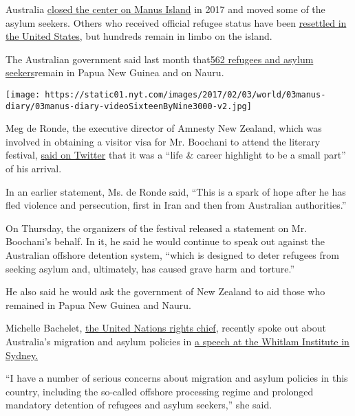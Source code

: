 Australia
\href{https://www.nytimes.com/2017/11/02/world/australia/manus-island-refugees.html?module=inline}{closed
the center on Manus Island} in 2017 and moved some of the asylum
seekers. Others who received official refugee status have been
\href{https://www.nytimes.com/2018/01/23/world/australia/manus-refugees-trump.html?module=inline}{resettled
in the United States}, but hundreds remain in limbo on the island.

The Australian government said last month
that\href{https://www.refugeecouncil.org.au/operation-sovereign-borders-offshore-detention-statistics/}{562
refugees and asylum seekers}remain in Papua New Guinea and on Nauru.

\texttt{[image: https://static01.nyt.com/images/2017/02/03/world/03manus-diary/03manus-diary-videoSixteenByNine3000-v2.jpg]}

Meg de Ronde, the executive director of Amnesty New Zealand, which was
involved in obtaining a visitor visa for Mr. Boochani to attend the
literary festival,
\href{https://twitter.com/MegdeRonde/status/1194932484758110208}{said on
Twitter} that it was a ``life \& career highlight to be a small part''
of his arrival.

In an earlier statement, Ms. de Ronde said, ``This is a spark of hope
after he has fled violence and persecution, first in Iran and then from
Australian authorities.''

On Thursday, the organizers of the festival released a statement on Mr.
Boochani's behalf. In it, he said he would continue to speak out against
the Australian offshore detention system, ``which is designed to deter
refugees from seeking asylum and, ultimately, has caused grave harm and
torture.''

He also said he would ask the government of New Zealand to aid those who
remained in Papua New Guinea and Nauru.

Michelle Bachelet,
\href{https://www.abc.net.au/news/2019-10-09/un-bachelet-criticises-australia-asylum-seeker-policies/11588084?pfmredir=sm}{the
United Nations rights chief}, recently spoke out about Australia's
migration and asylum policies in
\href{https://www.whitlam.org/publications/2019/10/9/2019-whitlam-oration-un-human-rights-commissioner-michelle-bachelet}{a
speech at the Whitlam Institute in Sydney.}

``I have a number of serious concerns about migration and asylum
policies in this country, including the so-called offshore processing
regime and prolonged mandatory detention of refugees and asylum
seekers,'' she said.

